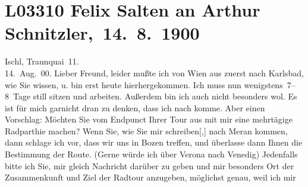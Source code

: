 

\section[ Felix Salten an Arthur Schnitzler, 14. 8. 1900]{L03310 Felix Salten an Arthur Schnitzler, 14. 8. 1900}
\nopagebreak{}
\rehead{ }\normalsize\beginnumbering{}
\toendnotes[C]{\smallbreak\pagebreak[2]}
\toendnotes[C]{\smallbreak}
\pstart
           \raggedleft{}{\pb}Ischl, Traunquai 11. {\\}14. Aug. 00.\pend
           \vspace{0.5em}
\pstart
           Lieber Freund, leider mußte ich von Wien aus zuerst nach Karlsbad, wie Sie
               wissen, u. bin erst heute hierhergekommen. Ich muss
               nun wenigstens 7–8 Tage still sitzen und arbeiten. Außerdem bin ich auch nicht
               besonders wol. Es ist für mich garnicht dran zu denken, dass ich nach \label{K_L03310-1v}\label{K_L03310-1} komme. Aber einen Vorschlag: Möchten Sie vom Endpunct Ihrer Tour aus mit mir
               eine mehrtägige Radparthie machen? Wenn Sie, wie Sie mir
                  schreiben{[},{]} nach Meran
               kommen, dann schlage ich vor, dass wir uns in Bozen treffen, und überlasse dann Ihnen die Bestimmung der Route. (Gerne {\pb}würde ich über Verona nach Venedig)
               Jedenfalls bitte ich Sie, mir gleich Nachricht darüber zu geben und mir besonders Ort
               der Zusammenkunft und Ziel der Radtour anzugeben, möglichst genau, weil ich mir
